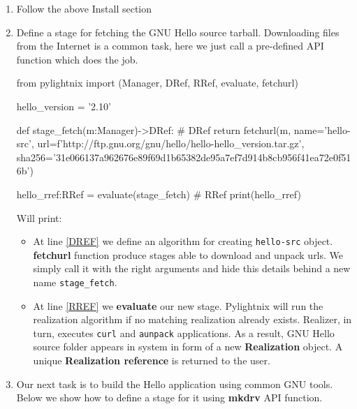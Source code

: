 \documentclass{article}
\begin{document}
\begin{enumerate}

  \item Follow the above Install section

  \item Define a stage for fetching the GNU Hello source tarball. Downloading
    files from the Internet is a common task, here we just call a pre-defined
    API function which does the job.

    \begin{pythontexcode}
    from pylightnix import (Manager, DRef, RRef, evaluate, fetchurl)

    hello_version = '2.10'

    def stage_fetch(m:Manager)->DRef: # DRef \label{DREF}
      return fetchurl(m,
        name='hello-src',
        url=f'http://ftp.gnu.org/gnu/hello/hello-{hello_version}.tar.gz',
        sha256='31e066137a962676e89f69d1b65382de95a7ef7d914b8cb956f41ea72e0f516b')

    hello_rref:RRef = evaluate(stage_fetch)  # RRef \label{RREF}
    print(hello_rref)
    \end{pythontexcode}

    Will print:
    \par
    \stdoutpythontex
    \par

    \begin{itemize}

      \item At line \ref{DREF} we define an algorithm for creating
        \texttt{hello-src} object. \textbf{fetchurl} function produce stages
        able to download and unpack urls. We simply call it with
        the right arguments and hide this details behind a new name
        \texttt{stage\_fetch}.

      \item At line \ref{RREF} we \textbf{evaluate} our new stage. Pylightnix
        will run the realization algorithm if no matching realization already
        exists. Realizer, in turn, executes \texttt{curl} and \texttt{aunpack}
        applications. As a result, GNU Hello source folder appears in system in
        form of a new \textbf{Realization} object. A unique \textbf{Realization
        reference} is returned to the user.

    \end{itemize}

  \item Our next task is to build the Hello application using common GNU tools.
    Below we show how to define a stage for it using \textbf{mkdrv} API
    function.


\end{enumerate}
\end{document}
